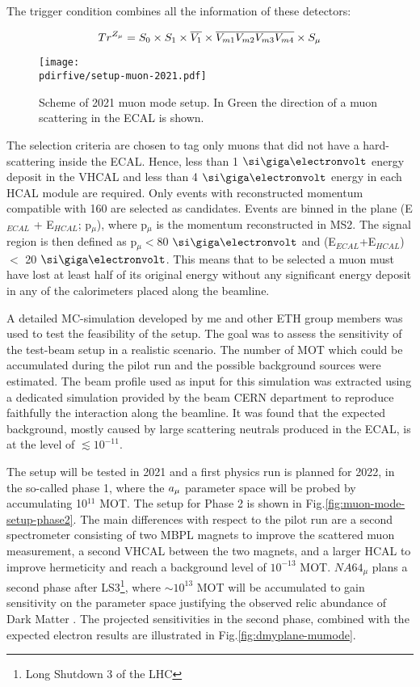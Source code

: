 The trigger condition combines all the information of these detectors:

\begin{equation}
\label{eq:trigger-mumode}
Tr^{Z_{\mu}} = S_0 \times S_1 \times \overline{V_1} \times \overline{V_{m1}}\overline{V_{m2}}\overline{V_{m3}}\overline{V_{m4}}\times S_{\mu}
\end{equation}

\begin{figure}[bth!]
  \centering
  \texttt{[image: \\pdirfive/setup-muon-2021.pdf]}
  \caption[Sketch of muon mode setup 2021 for phase 1]{Scheme of 2021 muon mode setup. In Green the direction of a muon scattering in the ECAL is shown.}
  \label{fig:muon-mode-setup}
\end{figure}

The selection criteria are chosen to tag only muons that did not have a hard-scattering inside the ECAL. Hence, less than 1 $\gev$ energy deposit in the VHCAL and less than 4 $\gev$ energy in each HCAL module are required. Only events with reconstructed momentum compatible with 160 \gev are selected as candidates. Events are binned in the plane (E$_{ECAL}$ + E$_{HCAL}$; p$_{\mu}$), where p$_{\mu}$ is the momentum reconstructed in MS2. The signal region is then defined as p$_{\mu} <$80 $\gev$ and (E$_{ECAL}$+E$_{HCAL}$) $<$ 20 $\gev$. This means that to be selected a muon must have lost at least half of its original energy without any significant energy deposit in any of the calorimeters placed along the beamline.

A detailed MC-simulation developed by me and other ETH group members was used to test the feasibility of the setup. The goal was to assess the sensitivity of the test-beam setup in a realistic scenario. The number of MOT which could be accumulated during the pilot run and the possible background sources were estimated. The beam profile used as input for this simulation was extracted using a dedicated simulation provided by the beam CERN department to reproduce faithfully the interaction along the beamline. It was found that the expected background, mostly caused by large scattering neutrals produced in the ECAL, is at the level of $\lesssim 10^{-11}$. 

The setup will be tested in 2021 and a first physics run is planned for 2022, in the so-called phase 1, where the $a_{\mu}$ parameter space will be probed by accumulating 10$^{11}$ MOT. The setup for Phase 2 is shown in Fig.\ref{fig:muon-mode-setup-phase2}. The main differences with respect to the pilot run are a second spectrometer consisting of two MBPL magnets to improve the scattered muon measurement, a second VHCAL between the two magnets, and a larger HCAL to improve hermeticity and reach a background level of $10^{-13}$ MOT. $NA64_{\mu}$ plans a second phase after LS3\footnote{Long Shutdown 3 of the LHC}, where $\sim 10^{13}$ MOT will be accumulated to gain sensitivity on the parameter space justifying the observed relic abundance of Dark Matter \cite{Gninenko:2640930}. The projected sensitivities in the second phase, combined with the expected electron results are illustrated in Fig.\ref{fig:dmyplane-mumode}.

